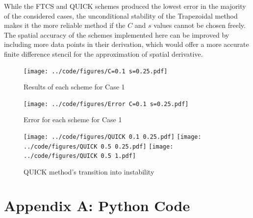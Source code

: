 \documentclass[twocolumn,10pt]{asme2ej}
\begin{document}
While the FTCS and QUICK schemes produced the lowest error in the majority of the considered cases, the unconditional stability of the Trapezoidal method makes it the more reliable method if the $C$ and $s$ values cannot be chosen freely. The spatial accuracy of the schemes implemented here can be improved by including more data points in their derivation, which would offer a more accurate finite difference stencil for the approximation of spatial derivative.

\begin{figure}[thb]
\begin{center}
\texttt{[image: ../code/figures/C=0.1 s=0.25.pdf]}
\caption{Results of each scheme for Case 1}
\label{case_1_results}
\end{center}
\end{figure}

\begin{figure}[thb]
\begin{center}
\texttt{[image: ../code/figures/Error C=0.1 s=0.25.pdf]}
\caption{Error for each scheme for Case 1}
\label{case_1_error}
\end{center}
\end{figure}

\nocite{*}



\begin{figure}[thb]
\begin{center}
\texttt{[image: ../code/figures/QUICK 0.1 0.25.pdf]}
\texttt{[image: ../code/figures/QUICK 0.5 0.25.pdf]}
\texttt{[image: ../code/figures/QUICK 0.5 1.pdf]}
\caption{QUICK method's transition into instability}
\label{QUICK_transition}
\end{center}
\end{figure}

\clearpage
\onecolumn
\appendix       %
\section*{Appendix A: Python Code}




\end{document}

